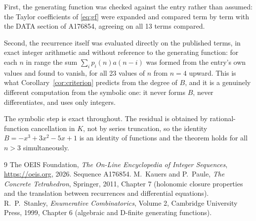 \documentclass[11pt,a4paper]{article}
\theoremstyle{plain}
\theoremstyle{definition}
\begin{document}
First, the generating function was checked against the entry rather than assumed: the
Taylor coefficients of \eqref{eq:gf} were expanded and compared term by term with the DATA
section of A176854, agreeing on all 13 terms compared.

Second, the recurrence itself was evaluated directly on the published terms, in exact
integer arithmetic and without reference to the generating function: for each $n$ in range
the sum $\sum_{i}p_{i}(n)a(n-i)$ was formed from the entry's own values and found to
vanish, for all 23 values of $n$ from $n=4$ upward. This is what
Corollary~\ref{cor:criterion} predicts from the degree of $B$, and it is a genuinely
different computation from the symbolic one: it never forms $B$, never differentiates, and
uses only integers.

The symbolic step is exact throughout. The residual is obtained by rational-function
cancellation in $K$, not by series truncation, so the identity $B=- x^{3} + 3 x^{2} - 5 x + 1$ is an
identity of functions and the theorem holds for all $n>3$ simultaneously.

\begin{thebibliography}{9}
 The OEIS Foundation, \emph{The On-Line Encyclopedia of Integer Sequences},
\url{https://oeis.org}, 2026. Sequence A176854.
 M.~Kauers and P.~Paule, \emph{The Concrete Tetrahedron}, Springer, 2011,
Chapter 7 (holonomic closure properties and the translation between recurrences and
differential equations).
 R.~P.~Stanley, \emph{Enumerative Combinatorics}, Volume 2, Cambridge
University Press, 1999, Chapter 6 (algebraic and D-finite generating functions).
\end{thebibliography}
\end{document}
